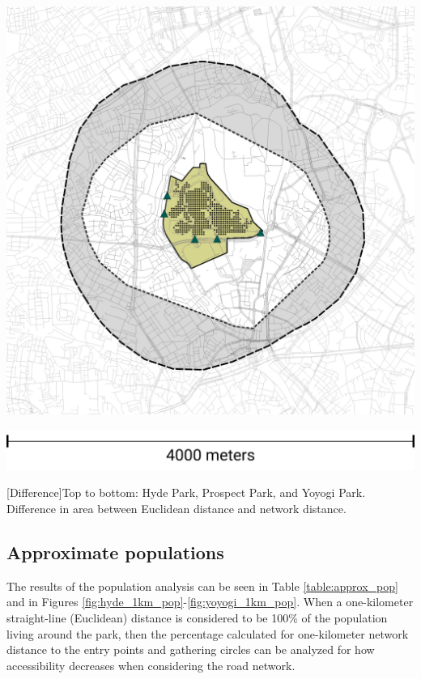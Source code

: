 \begin{multicols}{2}
\begin{minipage}{0.45\textwidth}
    \includegraphics[width=\linewidth]{images/network/yoyogi_difference.png}\par\hspace{5pt} %
    \includegraphics[width=\linewidth]{images/network/scale_legend_5.png}\par{}[Difference]{Top to bottom: Hyde Park, Prospect Park, and Yoyogi Park. Difference in area between Euclidean distance and network distance.}
    \label{fig:network_diff}
\end{minipage}

\subsection{Approximate populations}\label{approx_pop}
The results of the population analysis can be seen in Table \ref{table:approx_pop} and in Figures \ref{fig:hyde_1km_pop}-\ref{fig:yoyogi_1km_pop}. When a one-kilometer straight-line (Euclidean) distance is considered to be 100\% of the population living around the park, then the percentage calculated for one-kilometer network distance to the entry points and gathering circles can be analyzed for how accessibility decreases when considering the road network. 


\end{multicols}
